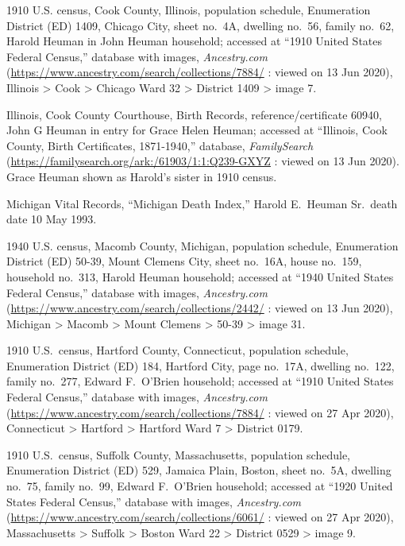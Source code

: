 \begin{thebibliography}{999}
1910 U.S. census, Cook County, Illinois, population schedule, Enumeration District (ED) 1409, Chicago City, sheet no.\ 4A, dwelling no.\ 56, family no.\ 62, Harold Heuman in John Heuman household; accessed at ``1910 United States Federal Census,'' database with images, \textit{Ancestry.com} (\url{https://www.ancestry.com/search/collections/7884/} : viewed on 13 Jun 2020), Illinois > Cook > Chicago Ward 32 > District 1409 > image 7.

Illinois, Cook County Courthouse, Birth Records, reference/certificate 60940, John G Heuman in entry for Grace Helen Heuman; accessed at ``Illinois, Cook County, Birth Certificates, 1871-1940,'' database, \textit{FamilySearch} (\url{https://familysearch.org/ark:/61903/1:1:Q239-GXYZ} : viewed on 13 Jun 2020). Grace Heuman shown as Harold's sister in 1910 census.

Michigan Vital Records, ``Michigan Death Index,'' Harold E.\ Heuman Sr.\, death date 10 May 1993.

1940 U.S. census, Macomb County, Michigan, population schedule, Enumeration District (ED) 50-39, Mount Clemens City, sheet no.\ 16A, house no.\ 159, household no.\ 313, Harold Heuman household; accessed at ``1940 United States Federal Census,'' database with images, \textit{Ancestry.com} (\url{https://www.ancestry.com/search/collections/2442/} : viewed on 13 Jun 2020), Michigan > Macomb > Mount Clemens > 50-39 > image 31.


1910 U.S.\ census, Hartford County, Connecticut, population schedule, Enumeration District (ED) 184, Hartford City, page no.\ 17A, dwelling no.\ 122, family no.\ 277, Edward F.\ O'Brien household; accessed at ``1910 United States Federal Census,'' database with images, \textit{Ancestry.com} (\url{https://www.ancestry.com/search/collections/7884/} : viewed on 27 Apr 2020), Connecticut > Hartford > Hartford Ward 7 > District 0179.

1910 U.S.\ census, Suffolk County, Massachusetts, population schedule, Enumeration District (ED) 529, Jamaica Plain, Boston, sheet no.\ 5A, dwelling no.\ 75, family no.\ 99, Edward F.\ O'Brien household; accessed at ``1920 United States Federal Census,'' database with images, \textit{Ancestry.com} (\url{https://www.ancestry.com/search/collections/6061/} : viewed on 27 Apr 2020), Massachusetts > Suffolk > Boston Ward 22 > District 0529 > image 9.


\end{thebibliography}
